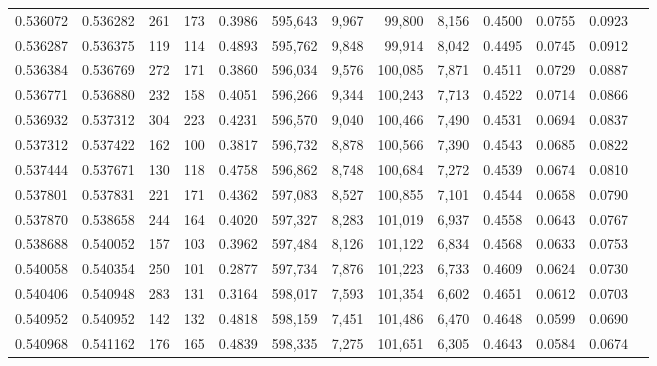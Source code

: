 \begin{tabular}{rrrrrrrrrrrrr}
0.536072 & 0.536282 &   261 &   173 &                                     0.3986 & 595,643 &   9,967 &  99,800 &   8,156 & 0.4500 & 0.0755 & 0.0923 \\
0.536287 & 0.536375 &   119 &   114 &                                     0.4893 & 595,762 &   9,848 &  99,914 &   8,042 & 0.4495 & 0.0745 & 0.0912 \\
0.536384 & 0.536769 &   272 &   171 &                                     0.3860 & 596,034 &   9,576 & 100,085 &   7,871 & 0.4511 & 0.0729 & 0.0887 \\
0.536771 & 0.536880 &   232 &   158 &                                     0.4051 & 596,266 &   9,344 & 100,243 &   7,713 & 0.4522 & 0.0714 & 0.0866 \\
0.536932 & 0.537312 &   304 &   223 &                                     0.4231 & 596,570 &   9,040 & 100,466 &   7,490 & 0.4531 & 0.0694 & 0.0837 \\
0.537312 & 0.537422 &   162 &   100 &                                     0.3817 & 596,732 &   8,878 & 100,566 &   7,390 & 0.4543 & 0.0685 & 0.0822 \\
0.537444 & 0.537671 &   130 &   118 &                                     0.4758 & 596,862 &   8,748 & 100,684 &   7,272 & 0.4539 & 0.0674 & 0.0810 \\
0.537801 & 0.537831 &   221 &   171 &                                     0.4362 & 597,083 &   8,527 & 100,855 &   7,101 & 0.4544 & 0.0658 & 0.0790 \\
0.537870 & 0.538658 &   244 &   164 &                                     0.4020 & 597,327 &   8,283 & 101,019 &   6,937 & 0.4558 & 0.0643 & 0.0767 \\
0.538688 & 0.540052 &   157 &   103 &                                     0.3962 & 597,484 &   8,126 & 101,122 &   6,834 & 0.4568 & 0.0633 & 0.0753 \\
0.540058 & 0.540354 &   250 &   101 &                                     0.2877 & 597,734 &   7,876 & 101,223 &   6,733 & 0.4609 & 0.0624 & 0.0730 \\
0.540406 & 0.540948 &   283 &   131 &                                     0.3164 & 598,017 &   7,593 & 101,354 &   6,602 & 0.4651 & 0.0612 & 0.0703 \\
0.540952 & 0.540952 &   142 &   132 &                                     0.4818 & 598,159 &   7,451 & 101,486 &   6,470 & 0.4648 & 0.0599 & 0.0690 \\
0.540968 & 0.541162 &   176 &   165 &                                     0.4839 & 598,335 &   7,275 & 101,651 &   6,305 & 0.4643 & 0.0584 & 0.0674 \\

\end{tabular}
